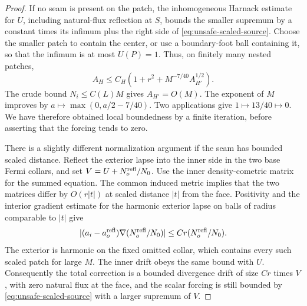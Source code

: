 \begin{proof}
If no seam is present on the patch, the inhomogeneous Harnack estimate
for \(U\), including natural-flux reflection at \(S\), bounds the
smaller supremum by a constant times its infimum plus the right side
of \eqref{eq:unsafe-scaled-source}.  Choose the smaller patch to
contain the center, or use a boundary-foot ball containing it, so that
the infimum is at most \(U(P)=1\).  Thus, on finitely many nested
patches,
\begin{equation}
 A_H\le C_H\left(1+r^2+M^{-7/40}A_{H'}^{1/2}\right).
 \label{eq:unsafe-nonseam-iteration}
\end{equation}
The crude bound \(N_i\le C(L)M\) gives \(A_{H'}=O(M)\).
The exponent of \(M\) improves by
\(a\mapsto\max(0,a/2-7/40)\).  Two applications give
\(1\mapsto13/40\mapsto0\).  We have therefore obtained local
boundedness by a finite iteration, before asserting that the forcing
tends to zero.

There is a slightly different normalization argument if the seam has
bounded scaled distance.  Reflect the exterior lapse into the inner
side in the two base Fermi collars, and set
\(V=U+N_o^{\rm refl}/N_0\).  Use the inner density-cometric matrix
for the summed equation.  The common induced metric implies that the
two matrices differ by \(O(r|t|)\) at scaled distance \(|t|\) from
the face.  Positivity and the interior gradient estimate for the
harmonic exterior lapse on balls of radius comparable to \(|t|\)
give
\begin{equation}
 |(a_i-a_o^{\rm refl})\nabla(N_o^{\rm refl}/N_0)|
 \le Cr(N_o^{\rm refl}/N_0).
 \label{eq:unsafe-seam-drift}
\end{equation}
The exterior is harmonic on the fixed omitted collar, which contains
every such scaled patch for large \(M\).  The inner drift obeys the
same bound with \(U\).  Consequently the total correction is a
bounded divergence drift of size \(Cr\) times \(V\), with zero
natural flux at the face, and the scalar forcing is still bounded by
\eqref{eq:unsafe-scaled-source} with a larger supremum of \(V\).


\end{proof}
